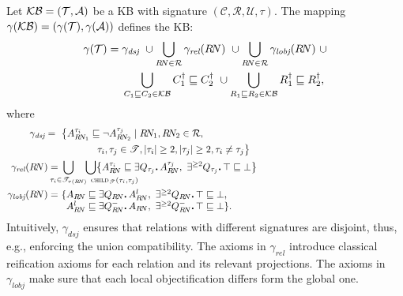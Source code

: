 \documentclass[draft]{article}
\newcommand{\KB}{\ensuremath{\mathcal{KB}}\xspace}
\newcommand{\per}{\mathpunct{\mbox{\bf .}}}
\newcommand{\chd}[2]{\ensuremath{\textsc{child}_{\mathscr{T}}(#1,#2)}\xspace}
\newcommand{\A}{\ensuremath{\mathcal{A}}\xspace}
\begin{document}
Let $\KB = (\Tmc, \A)$ be a \DLRpm KB with signature
$(\mathcal{C},\mathcal{R},\mathcal{U},\tau)$. The mapping
$\gamma(\KB) = (\gamma(\Tmc),\gamma(\A))$ defines the
\ALCQI KB:
%
\begin{align*}
  \gamma(\Tmc)  = {} &  \gamma_{\textit{dsj}} ~\cup %
  \bigcup_{R\!N\in\Rmc}\gamma_{\textit{rel}}(R\!N) ~\cup %
  \bigcup_{R\!N\in\Rmc}\gamma_{\textit{lobj}}({R\!N})
  ~\cup \\
  & \bigcup_{C_1\sqsubseteq C_2\in\KB}{C_1^\dag\sqsubseteq C_2^\dag}
  ~\cup%
 \bigcup_{R_1\sqsubseteq R_2\in\KB}{R_1^\dag\sqsubseteq
    R_2^\dag},%
\end{align*}
%
where
\vspace{-1ex}
%
\begin{align*}
\gamma_\textit{dsj} = {} %
&~\bigl\{A_{R\!N_1}^{\tau_i}\sqsubseteq\neg A_{R\!N_2}^{\tau_j} \mid R\!N_1, R\!N_2\in\Rmc, \\
 & \qquad \qquad \tau_i, \tau_j\in \mathscr{T}, |\tau_i|\geq 2, |\tau_j|\geq 2, \tau_i\neq \tau_j
  \bigr\}\\
%
  \gamma_{\textit{rel}}(R\!N) =&~\bigcup_{\mathclap{\tau_i\in\mathscr{T}_{\tau(R\!N)}}}\quad
     \bigcup_{\mathrlap{\chd{\tau_i}{\tau_j}}}\bigl\{
     A^{\tau_i}_{R\!N} \sqsubseteq \exists Q_{\tau_j}\per A^{\tau_j}_{R\!N},~\exists^{\geq 2}
     Q_{\tau_j}\per\top\sqsubseteq \bot
     \bigr\} \\
%
\gamma_{\textit{lobj}}({R\!N}) =&~\{\parbox[t]{\textwidth}{$
A_{R\!N}\sqsubseteq\exists Q_{R\!N}\per A_{R\!N}^l,~
\exists^{\geq 2}Q_{R\!N}\per \top\sqsubseteq \bot,\\
A_{R\!N}^l \sqsubseteq \exists Q_{R\!N}^-\per A_{R\!N},~
\exists^{\geq 2} Q_{R\!N}^-\per \top\sqsubseteq \bot\}.$}
\end{align*}
%
Intuitively, $\gamma_\textit{dsj}$ ensures that relations with different signatures are disjoint, thus, e.g., enforcing the union compatibility. The axioms in $\gamma_{\textit{rel}}$ introduce classical reification axioms for each relation and its relevant projections. The axioms in $\gamma_{\textit{lobj}}$ make sure that each local objectification differs form the global one.
\end{document}
